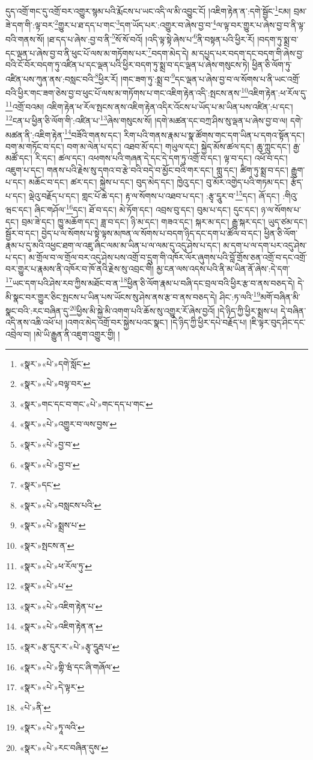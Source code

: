 དུད་འགྲོ་གང་དུ་འགྲོ་བར་འགྱུར་སྙམ་པའི་རྨོངས་པ་ཡང་འདི་ལ་མི་འབྱུང་ངོ། །འཇིག་རྟེན་ན་:དགེ་སྦྱོང་\footnote{«སྣར་»«པེ་»དགེ་སློང་}ངམ། བྲམ་ཟེ་དག་གི་:ལྟ་བར་\footnote{«སྣར་»«པེ་»བལྟ་བར་}གྱུར་པ་ཐ་དད་པ་གང་\footnote{«སྣར་»གང་དང་བ་གང་«པེ་»གང་དད་པ་གང་}དག་ཡོད་པར་:འགྱུར་བ་ཞེས་བྱ་བ་\footnote{«སྣར་»«པེ་»འགྱུར་བ་ལས་བྱས་}ལ་ལྟ་བར་གྱུར་པ་ཞེས་བྱ་བ་ནི་ལྟ་བའི་གནས་སོ། །ཐ་དད་པ་ཞེས་:བྱ་བ་ནི་\footnote{«སྣར་»«པེ་»བྱ་བ་}སོ་སོ་བའོ། །འདི་ལྟ་སྟེ་ཞེས་པ་\footnote{«སྣར་»«པེ་»བྱ་བ་}ནི་བསྟན་པའི་ཕྱིར་རོ། །བདག་ཏུ་སྨྲ་བ་དང་ལྡན་པ་ཞེས་བྱ་བ་ནི་ཕུང་པོ་ལས་མ་གཏོགས་པར་\footnote{«སྣར་»དང་}བདག་མེད་དེ། མ་དཔྱད་པར་བདག་དང་བདག་གི་ཞེས་བྱ་བའི་ངོ་བོར་བདག་ཏུ་འཛིན་པ་དང་ལྡན་པའི་ཕྱིར་བདག་ཏུ་སྨྲ་བ་དང་ལྡན་པ་ཞེས་གསུངས་ཏེ། ཕྱིན་ཅི་ལོག་ཏུ་འཛིན་པས་ཀུན་ནས་:བསླང་བའི་\footnote{«སྣར་»«པེ་»བསླངས་པའི་}ཕྱིར་རོ། །གང་ཟག་ཏུ་:སྨྲ་བ་\footnote{«སྣར་»«པེ་»སྨྲས་པ་}དང་ལྡན་པ་ཞེས་བྱ་བ་ལ་སོགས་པ་ནི་ཡང་འགྲོ་བའི་ཕྱིར་གང་ཟག་ཅེས་བྱ་བ་ཕུང་པོ་ལས་མ་གཏོགས་པ་གང་འཇིག་རྟེན་འདི་:སྤངས་ནས་\footnote{«སྣར་»སྤངས་ན་}འཇིག་རྟེན་:ཕ་རོལ་དུ་\footnote{«སྣར་»«པེ་»ཕ་རོལ་ཏུ་}འགྲོ་བའམ། འཇིག་རྟེན་ཕ་རོལ་སྤངས་ནས་འཇིག་རྟེན་འདིར་འོངས་པ་ཡོད་པ་མ་ཡིན་པས་འཛིན་:པ་དང་། \footnote{«སྣར་»«པེ་»པ་}ངན་པ་ཕྱིན་ཅི་ལོག་གི་:འཛིན་པ་\footnote{«སྣར་»«པེ་»འཇིག་རྟེན་པ་}ཞེས་གསུངས་སོ། །དགེ་མཚན་དང་བཀྲ་ཤིས་སུ་ལྡན་པ་ཞེས་བྱ་བ་ལ། དགེ་མཚན་ནི་:འཇིག་རྟེན་\footnote{«སྣར་»«པེ་»འཇིག་རྟེན་ན་}བཟོའི་གནས་དང་། རིག་པའི་གནས་རྣམ་པ་སྣ་ཚོགས་གང་དག་ཡིན་པ་དགའ་སྟོན་དང་། བག་མ་གཏོང་བ་དང་། བག་མ་ལེན་པ་དང་། འཐབ་མོ་དང་། གཡུལ་དང་། སྐྱེད་མོས་ཚལ་དང་། ཆུ་ཀླུང་དང་། རྒྱ་མཚོ་དང་། རི་དང་། ཚལ་དང་། འཕགས་པའི་གཞན་དེ་དང་དེ་དག་ཏུ་འགྲོ་བ་དང་། ལྟ་བ་དང་། འཕོ་བ་དང་། འཇུག་པ་དང་། གནས་པའི་རྗེས་སུ་དགའ་བ་རྩེ་བའི་བདེ་བ་མྱོང་བའི་གར་དང་། གླུ་དང་། ཚིག་ཏུ་སྨྲ་བ་དང་། རྒྱུག་པ་དང་། མཆོང་བ་དང་། ཚར་དང་། སྐྱེས་པ་དང་། བུད་མེད་དང་། ཁྱེའུ་དང་། བུ་མོར་འགྱེད་པའི་གཏམ་དང་། རྩོད་པ་དང་། ལྡེའུ་བརྗོད་པ་དང་། གླང་པོ་ཆེ་དང་། རྟ་ལ་སོགས་པ་འཐབ་པ་དང་། :རྩྭ་དཱུར་བ་\footnote{«སྣར་»རྩ་དུར་ར་«པེ་»རྩྭ་དཱུརྦ་པ་}དང་། ཞོ་དང་། :གིའུ་ཝང་དང་། ཞིང་གཤོལ་\footnote{«སྣར་»«པེ་»གྷི་ཝཾ་དང་ཞི་གཞོལ་}དང་། ཐོ་བ་དང་། མེ་ཏོག་དང་། འབྲས་བུ་དང་། བུམ་པ་དང་། དུང་དང་། ཉ་ལ་སོགས་པ་དང་། བྲམ་ཟེ་དང་། ཁྱུ་མཆོག་དང་། ཟླ་བ་དང་། ཉི་མ་དང་། གཟའ་དང་། སྐར་མ་དང་། རྒྱུ་སྐར་དང་། ཡུད་ཙམ་དང་། སྦྱོར་བ་དང་། བྱེད་པ་ལ་སོགས་པ་སྟེ་ལྟས་མཁན་ལ་སོགས་པ་བདག་ཉིད་དང་དག་པ་ཚོལ་བ་དང་། ཕྱིན་ཅི་ལོག་རྣམ་པ་དུ་མའི་འཕྱང་ཐག་ལ་འཇུ་ཞིང་ལམ་མ་ཡིན་པ་ལ་ལམ་དུ་འདུ་ཤེས་པ་དང་། མ་དག་པ་ལ་དག་པར་འདུ་ཤེས་པ་དང་། མ་གྲོལ་བ་ལ་གྲོལ་བར་འདུ་ཤེས་པས་འགྲོ་བ་དྲུག་གི་འཁོར་ལོར་ཞུགས་པའི་བློ་གྲོས་ཅན་འགྲོ་བ་དང་འགྲོ་བར་གྱུར་པ་རྣམས་ནི་འཁོར་བ་ཁོ་ནའི་རྗེས་སུ་འབྲང་གི། མྱ་ངན་ལས་འདས་པའི་ནི་མ་ཡིན་ནོ་ཞེས་:དེ་དག་\footnote{«སྣར་»«པེ་»དེ་ལྟར་}ཡང་དག་པའི་ཤེས་རབ་ཀྱིས་མཐོང་བ་ན་\footnote{«པེ་»ནི་}ཕྱིན་ཅི་ལོག་རྣམ་པ་བཞི་དང་བྲལ་བའི་ཕྱིར་རྩ་བ་ནས་བཅད་དེ། དེ་མི་སྣང་བར་གྱུར་ཅིང་སྤངས་པ་ཡིན་པས་ཡོངས་སུ་ཤེས་ནས་རྩ་བ་ནས་བཅད་དེ། ཤིང་:ཏ་ལའི་\footnote{«སྣར་»«པེ་»ཏཱ་ལའི་}མགོ་བཞིན་མི་སྣང་བའི་:རང་བཞིན་དུ་\footnote{«སྣར་»«པེ་»རང་བཞིན་དུས་}ཕྱིས་མི་སྐྱེ་མི་འགག་པའི་ཆོས་སུ་འགྱུར་རོ་ཞེས་བྱའོ། །དེ་ཉིད་ཀྱི་ཕྱིར་སྨྲས་པ། དེ་བཞིན་འདི་ནས་འཆི་འཕོ་པ། །འགའ་མེད་འགྲོ་བར་སྐྱེས་པའང་སྣང་། །དེ་ཉིད་ཀྱི་ཕྱིར་དཔེ་བརྗོད་པ། །ཇི་ལྟར་བུད་ཤིང་དང་འབྲེལ་བ། །མེ་ཡི་རྒྱུན་ནི་འཇུག་འགྱུར་གྱི། །
